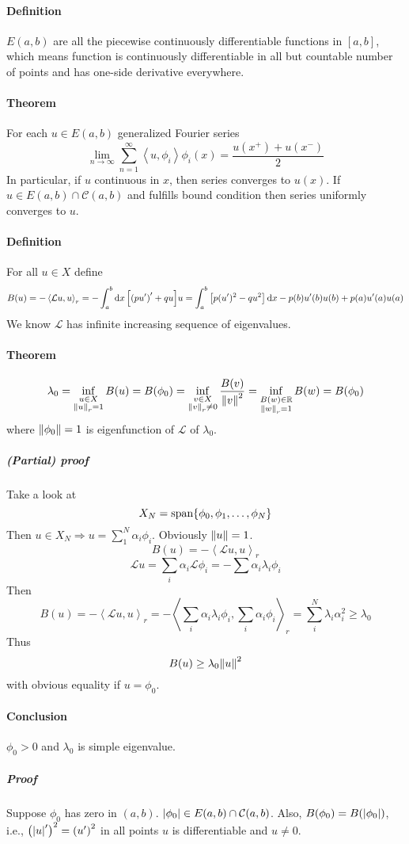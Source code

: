 \paragraph{Definition}
$E(a,b)$ are all the piecewise continuously differentiable  functions in $[a,b]$, which means function is continuously differentiable in all but countable number of points and has one-side derivative everywhere.
\paragraph{Theorem}
For each $u \in E(a,b)$ generalized Fourier series
$$\lim_{n\to \infty} \sum_{n=1}^\infty \left\langle u, \phi_i \right\rangle \phi_i(x) = \frac{u(x^+) + u(x^-)}{2}$$
In particular, if $u$ continuous in $x$, then series converges to $u(x)$. If $u\in E(a,b) \cap \mathcal{C}(a,b)$ and fulfills bound condition then series uniformly converges to $u$. 
\paragraph{Definition}
For all $u\in X$ define
$$B(u) = -\left\langle \mathcal{L}u, u \right\rangle_r = -\int_a^b \dd{x} \qty[\qty(pu')'+ qu]u = \int_a^b \qty[p(u')^2 - qu^2] \dd{x} - p(b)u'(b)u(b) + p(a)u'(a) u(a) $$
We know $\mathcal{L}$ has infinite increasing sequence of eigenvalues.
\paragraph{Theorem}
$$\lambda_0 = \inf\limits_{\substack{u\in X \\  \norm{u}_r=1}} B(u) = B(\phi_0) = \inf\limits_{\substack{v\in X \\  \norm{v}_r\neq0}} \frac{B(v)}{\norm{v}^2}  = \inf\limits_{\substack{B(w)\in \mathbb{R} \\  \norm{w}_r=1}} B(w)  = B(\phi_0)$$
where $\norm{\phi_0}=1$ is eigenfunction of $\mathcal{L}$ of $\lambda_0$.
\subparagraph{(Partial) proof}
Take a look at
$$X_N = \text{span} \qty{\phi_0, \phi_1, \dots, \phi_N}$$
Then $u\in X_N \Rightarrow u = \sum_1^N \alpha_i \phi_i$. Obviously $\norm{u}=1$.
$$B(u) = -\left\langle \mathcal{L}u, u \right\rangle_r $$
$$\mathcal{L}u = \sum_i \alpha_i \mathcal{L}\phi_i = -\sum \alpha_i \lambda_i \phi_i$$
Then
$$B(u) = -\left\langle \mathcal{L}u, u \right\rangle_r =  -\left\langle \sum_i\alpha_i \lambda_i \phi_i, \sum_i\alpha_i \phi_i \right\rangle_r = \sum_i^N \lambda_i \alpha_i^2  \geq \lambda_0$$
Thus 
$$B(u) \geq \lambda_0 \norm{u}^2$$
with obvious equality if $u=\phi_0$.
\paragraph{Conclusion} $\phi_0> 0$ and $\lambda_0$ is simple eigenvalue.
\subparagraph{Proof}
Suppose $\phi_0$ has zero in $(a,b)$. $\abs{ \phi_0} \in E(a,b) \cap \mathcal{C}(a,b)$. Also, $B(\phi_0) = B(\abs{ \phi_0})$, i.e., $\qty(\abs{u}')^2 = \qty(u')^2$ in all points $u$ is differentiable and $u\neq 0$.

